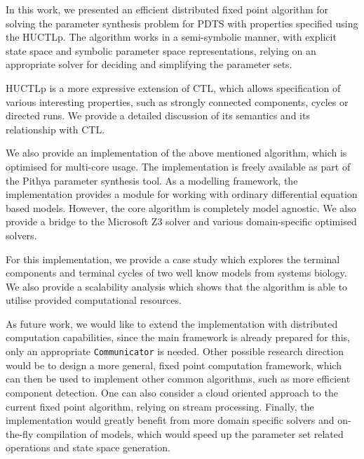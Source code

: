 In this work, we presented an efficient distributed fixed point algorithm for solving the parameter synthesis problem for \acf{PDTS} with properties specified using the \acf{HUCTLp}. The algorithm works in a semi-symbolic manner, with explicit state space and symbolic parameter space representations, relying on an appropriate solver for deciding and simplifying the parameter sets. 

\ac{HUCTLp} is a more expressive extension of \ac{CTL}, which allows specification of various interesting properties, such as strongly connected components, cycles or directed runs. We provide a detailed discussion of its semantics and its relationship with \ac{CTL}.

We also provide an implementation of the above mentioned algorithm, which is optimised for multi-core usage. The implementation is freely available as part of the Pithya parameter synthesis tool. As a modelling framework, the implementation provides a module for working with ordinary differential equation based models. However, the core algorithm is completely model agnostic. We also provide a bridge to the Microsoft Z3 solver and various domain-specific optimised solvers.

For this implementation, we provide a case study which explores the terminal components and terminal cycles of two well know models from systems biology. We also provide a scalability analysis which shows that the algorithm is able to utilise provided computational resources.

As future work, we would like to extend the implementation with distributed computation capabilities, since the main framework is already prepared for this, only an appropriate \texttt{Communicator} is needed. Other possible research direction would be to design a more general, fixed point computation framework, which can then be used to implement other common algorithms, such as more efficient component detection. One can also consider a cloud oriented approach to the current fixed point algorithm, relying on stream processing. Finally, the implementation would greatly benefit from more domain specific solvers and on-the-fly compilation of models, which would speed up the parameter set related operations and state space generation.
